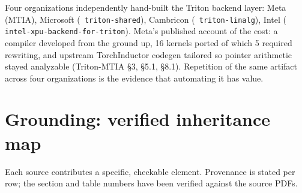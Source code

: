 \documentclass[11pt,a4paper]{article}
\newcommand{\code}[1]{\texttt{\small\hyphenchar\font=45 #1}}
\begin{document}
\noindent Four organizations independently hand-built the Triton backend layer: Meta (MTIA), Microsoft
(\code{triton-shared}), Cambricon (\code{triton-linalg}), Intel (\code{intel-xpu-backend-for-triton}). Meta's
published account of the cost: a compiler developed from the ground up, 16 kernels ported of which 5 required
rewriting, and upstream TorchInductor codegen tailored so pointer arithmetic stayed analyzable
(Triton-MTIA \S3, \S5.1, \S8.1). Repetition of the same artifact across four organizations is the evidence
that automating it has value.

\section{Grounding: verified inheritance map}\label{sec:grounding}

Each source contributes a specific, checkable element. Provenance is stated per row; the section and table
numbers have been verified against the source PDFs.
\end{document}
